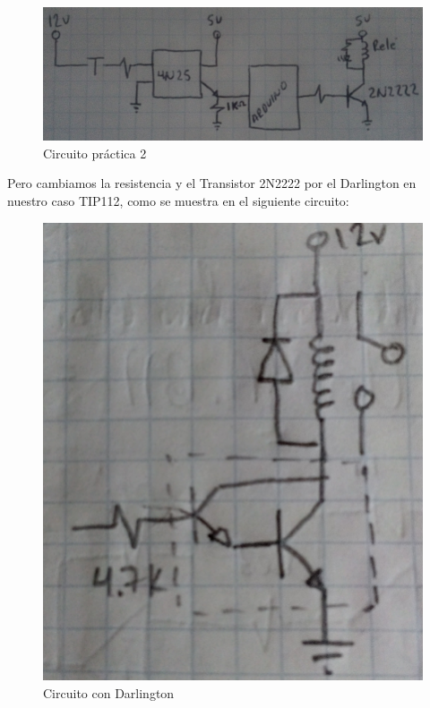 \documentclass[10pt,a4paper]{article}
\begin{document}
\begin{figure}[hbtp]
\centering
\includegraphics[scale=0.4]{Pictures/Circuito1.PNG}
\caption{Circuito práctica 2}
\end{figure}
Pero cambiamos la resistencia y el Transistor 2N2222 por el Darlington en nuestro caso TIP112, como se muestra en el siguiente circuito: 
\begin{figure}[hbtp]
\centering
\includegraphics[scale=0.05]{Pictures/Circuito 2}
\caption{Circuito con Darlington}
\end{figure}
\end{document}
